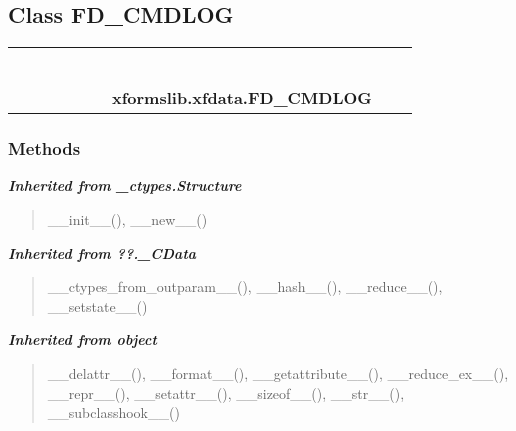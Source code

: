 \subsection{Class FD\_CMDLOG}

    \label{xformslib:xfdata:FD_CMDLOG}
\begin{tabular}{cccccccccc}
\multicolumn{2}{r}{\settowidth{\BCL}{object}\multirow{2}{\BCL}{object}}
&&
&&
&&
  \\\cline{3-3}
  &&\multicolumn{1}{c|}{}
&&
&&
&&
  \\
\multicolumn{4}{r}{\settowidth{\BCL}{??.\_CData}\multirow{2}{\BCL}{??.\_CData}}
&&
&&
  \\\cline{5-5}
  &&&&\multicolumn{1}{c|}{}
&&
&&
  \\
\multicolumn{6}{r}{\settowidth{\BCL}{\_ctypes.Structure}\multirow{2}{\BCL}{\_ctypes.Structure}}
&&
  \\\cline{7-7}
  &&&&&&\multicolumn{1}{c|}{}
&&
  \\
&&&&&&\multicolumn{2}{l}{\textbf{xformslib.xfdata.FD\_CMDLOG}}
\end{tabular}



  \subsubsection{Methods}


\large{\textbf{\textit{Inherited from \_ctypes.Structure}}}

\begin{quote}
\_\_init\_\_(), \_\_new\_\_()
\end{quote}

\large{\textbf{\textit{Inherited from ??.\_CData}}}

\begin{quote}
\_\_ctypes\_from\_outparam\_\_(), \_\_hash\_\_(), \_\_reduce\_\_(), \_\_setstate\_\_()
\end{quote}

\large{\textbf{\textit{Inherited from object}}}

\begin{quote}
\_\_delattr\_\_(), \_\_format\_\_(), \_\_getattribute\_\_(), \_\_reduce\_ex\_\_(), \_\_repr\_\_(), \_\_setattr\_\_(), \_\_sizeof\_\_(), \_\_str\_\_(), \_\_subclasshook\_\_()
\end{quote}

